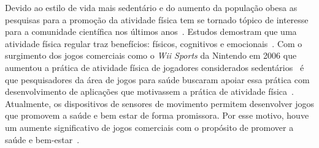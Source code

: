Devido ao estilo de vida mais sedentário e do aumento da população obesa as pesquisas para a promoção da atividade física tem se tornado tópico de interesse para a comunidade científica nos últimos anos~\cite{maitland2009,bartolome11,Mandryk2014}. Estudos demostram que uma atividade física regular traz benefícios: físicos, cognitivos e emocionais~\cite{Mandryk2014}. Com o surgimento dos jogos comerciais como o \textit{Wii Sports} da Nintendo em 2006 que aumentou a prática de atividade física de jogadores considerados sedentários~\cite{wiigraves2008} é que pesquisadores da área de jogos para saúde buscaram apoiar essa prática com desenvolvimento de aplicações que motivassem a prática de atividade física~\cite{stacey2011}. Atualmente, os dispositivos de sensores de movimento permitem desenvolver jogos que promovem a saúde e bem estar de forma promissora. Por esse motivo, houve um aumente significativo de jogos comerciais com o propósito de promover a saúde e bem-estar~\cite{Papastergiou:2009:EPC:1570538.
1570707}.





